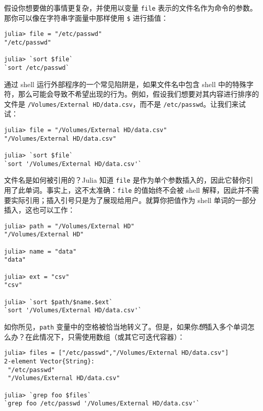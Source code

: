 假设你想要做的事情更复杂，并使用以变量 \texttt{file} 表示的文件名作为命令的参数。那你可以像在字符串字面量中那样使用 \texttt{\$} 进行插值：




\begin{verbatim}
julia> file = "/etc/passwd"
"/etc/passwd"

julia> `sort $file`
`sort /etc/passwd`
\end{verbatim}



通过 shell 运行外部程序的一个常见陷阱是，如果文件名中包含 shell 中的特殊字符，那么可能会导致不希望出现的行为。例如，假设我们想要对其内容进行排序的文件是 \texttt{/Volumes/External HD/data.csv}，而不是 \texttt{/etc/passwd}。让我们来试试：




\begin{verbatim}
julia> file = "/Volumes/External HD/data.csv"
"/Volumes/External HD/data.csv"

julia> `sort $file`
`sort '/Volumes/External HD/data.csv'`
\end{verbatim}



文件名是如何被引用的？Julia 知道 \texttt{file} 是作为单个参数插入的，因此它替你引用了此单词。事实上，这不太准确：\texttt{file} 的值始终不会被 shell 解释，因此并不需要实际引用；插入引号只是为了展现给用户。就算你把值作为 shell 单词的一部分插入，这也可以工作：




\begin{verbatim}
julia> path = "/Volumes/External HD"
"/Volumes/External HD"

julia> name = "data"
"data"

julia> ext = "csv"
"csv"

julia> `sort $path/$name.$ext`
`sort '/Volumes/External HD/data.csv'`
\end{verbatim}



如你所见，\texttt{path} 变量中的空格被恰当地转义了。但是，如果你\emph{想}插入多个单词怎么办？在此情况下，只需使用数组（或其它可迭代容器）：




\begin{verbatim}
julia> files = ["/etc/passwd","/Volumes/External HD/data.csv"]
2-element Vector{String}:
 "/etc/passwd"
 "/Volumes/External HD/data.csv"

julia> `grep foo $files`
`grep foo /etc/passwd '/Volumes/External HD/data.csv'`
\end{verbatim}



